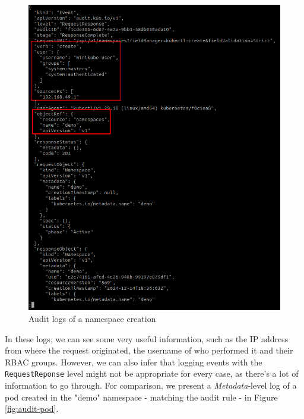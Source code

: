 \documentclass[a4paper,11pt,openright,BCOR=15mm]{scrbook}
\begin{document}
\begin{figure}[h!]
	\centering
	\includegraphics[scale=0.4]{figs/audit-namespace-create.png}
	\caption{Audit logs of a namespace creation}
	\label{fig:audit-namespace}
\end{figure}

In these logs, we can see some very useful information, such as the IP address from where the request originated, the username of who performed it and their RBAC groups. However, we can also infer that logging events with the \texttt{RequestReponse} level might not be appropriate for every case, as there's a lot of information to go through. For comparison, we present a \textit{Metadata}-level log of a pod created in the "demo" namespace - matching the audit rule - in Figure \ref{fig:audit-pod}.
\end{document}
